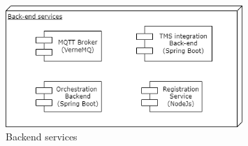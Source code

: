 \begin{figure}[!htpb]
    \centering
    \includegraphics[width=0.8\textwidth]{images/Backend}
    \caption{\footnotesize{Backend services}}
    \label{fig:backend_services}
\end{figure}


